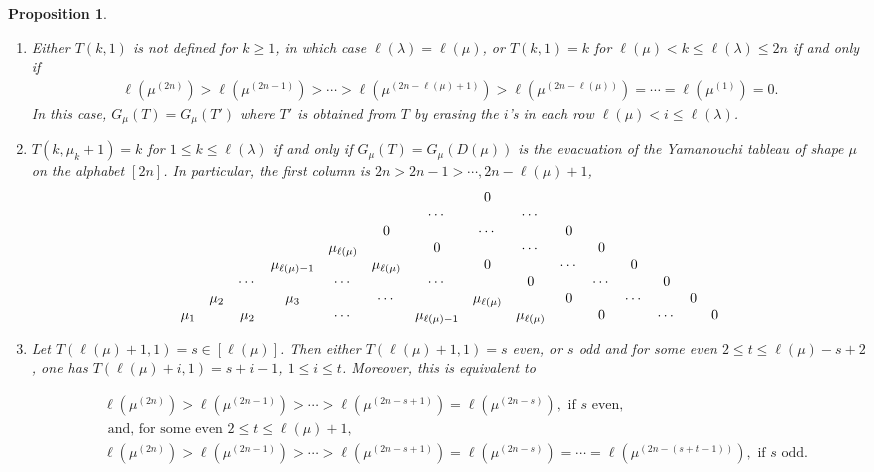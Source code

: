 \documentclass[reqno]{amsart}
\theoremstyle{tplain}
\newtheorem{prop}{Proposition}
\begin{document}
{\begin{prop}
\begin{enumerate}

\item Either $T(k,1)$  is not defined for $k\ge 1$, in which case $\ell(\lambda)=\ell(\mu)$, or $T(k,1)= k$ for $\ell (\mu)<k\le \ell (\lambda)\le 2n$ if and only if
\begin{align}\label{prop:sequencestrictlength}\ell(\mu^{(2n)})>\ell(\mu^{(2n-1)})>\cdots>
  \ell(\mu^{(2n-\ell(\mu)+1)})>\ell(\mu^{(2n-\ell(\mu))})=\cdots=\ell(\mu^{(1)})=0.
   \end{align}
   In this case, $G_\mu(T)=G_\mu(T')$ where $T'$ is obtained from $T$ by erasing the  $i$'s in each row $ \ell(\mu)< i\le \ell(\lambda)$.
   \item $T(k,\mu_k+1)= k$ for $1\le k\le \ell(\lambda)$ if and only if
   $G_\mu(T)=G_\mu(D(\mu))$ is  the evacuation  \cite{stanley,fulton} of the Yamanouchi tableau of shape $\mu$ on the alphabet $[2n]$. In particular, the first column is $2n>2n-1>\cdots,2n-\ell(\mu)+1$,
\begin{align}\begin{array}{cccccccccccccccccc}
&&&&&&&0\cr
&&&&&&\cdots&&\cdots&&\cr
&&&&&0&&\cdots&&0\cr
&&&&\mu_{\ell(\mu)}&&0&&\cdots&&0\cr
&&&\mu_{\ell(\mu)-1}&&\mu_{\ell(\mu)}&&0&&\cdots&&0\cr
&&\cdots&&\cdots&&\cdots&&0&&\cdots&&0\cr
&\mu_2&&\mu_3&&\cdots&&\mu_{\ell(\mu)}&&0&&\cdots&&0\cr
\mu_1&&\mu_2&&\cdots&&\mu_{\ell(\mu)-1}&&\mu_{\ell(\mu)}&&0&&\cdots&&0\cr
\end{array}
\end{align}

   \item Let $T(\ell(\mu)+1,1)=s\in [\ell(\mu)]$. Then either $T(\ell(\mu)+1,1)= s$ even, or  $s$ odd and for some even $2\le t\le \ell(\mu)-s+2$, one has $T(\ell(\mu)+i,1)=s+i-1$,  $ 1\le i\le t$. Moreover, this is equivalent to

       \begin{align}&\ell(\mu^{(2n)})>\ell(\mu^{(2n-1)})>\cdots>
  \ell(\mu^{(2n-s+1)})=\ell(\mu^{(2n-s)}), \mbox{ if  $s$ even},\\
  &\mbox{ and,  for some even $2\le t\le \ell(\mu)+1$, } \nonumber\\
  &  \ell(\mu^{(2n)})>\ell(\mu^{(2n-1)})>\cdots>
  \ell(\mu^{(2n-s+1)})=\ell(\mu^{(2n-s)})=\cdots=\ell(\mu^{(2n-(s+t-1))}), \mbox{ if  $s$ odd}.
  \end{align}



\end{enumerate}
\end{prop}}
\end{document}
